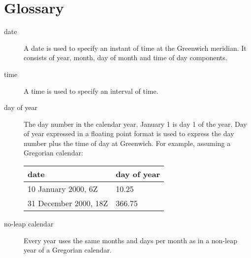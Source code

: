 \section{Glossary}

\begin{description}

\item [date] \label{glos:date} A date is used to specify an instant of time at the Greenwich meridian.  It consists
of year, month, day of month and time of day components.

\item [time] \label{glos:time} A time is used to specify an interval of time. 
              
\item [day of year] \label{glos:dayofyear} The day number in the calendar year. January 1 is day 1 of the year. 
Day of year expressed in a floating point format is used to express the day number plus the time of day 
at Greenwich. For example, assuming a Gregorian calendar: 

\begin{tabular}{ll}
{\bf date}              & {\bf day of year} \\
\hline 
10 January 2000, 6Z     & 10.25 \\
31 December 2000, 18Z   & 366.75 
\end{tabular}

\item [no-leap calendar] \label{glos:noleap} Every year uses the same months and days per month as in a non-leap 
year of a Gregorian calendar.

\end{description}












